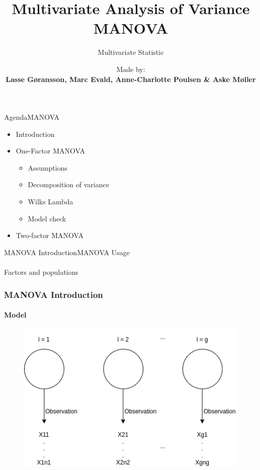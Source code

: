 \documentclass[aspectratio=169,10pt,t]{beamer}
\title{Multivariate Analysis of Variance MANOVA}
\subtitle{Multivariate Statistic}
\date{ }
\author{
	Made by: \\
	\textbf{Lasse Gøransson, Marc Evald, Anne-Charlotte Poulsen \& Aske Møller}
}
\institute[
  SDU Robotics\\
  The Maersk Mc-Kinney Moller Institute\\
  University of Southern Denmark
] %
{%
  SDU Robotics\\
  The Maersk Mc-Kinney Moller Institute\\
  University of Southern Denmark

}
\begin{document}
{\SDUwavesbg%
\begin{frame} %
  \titlepage
\end{frame}}
\begin{frame}{Agenda}{MANOVA}
    \begin{itemize}
        \item Introduction
        \item One-Factor MANOVA
            \begin{itemize}
                \item Assumptions
                \item Decomposition of variance
                \item Wilks Lambda
                \item Model check
            \end{itemize}
        \item Two-factor MANOVA 
    \end{itemize}
\end{frame}
\begin{frame}{MANOVA Introduction}{MANOVA}
    Usage  \\
    \\
    Factors and populations
\end{frame}
\begin{frame}[t]
    \frametitle{MANOVA Introduction}
    \framesubtitle{Model}
    \begin{figure}[H]
    \includegraphics[scale=0.5]{images/modelManoca.png}
    \end{figure}
\end{frame}
\end{document}
